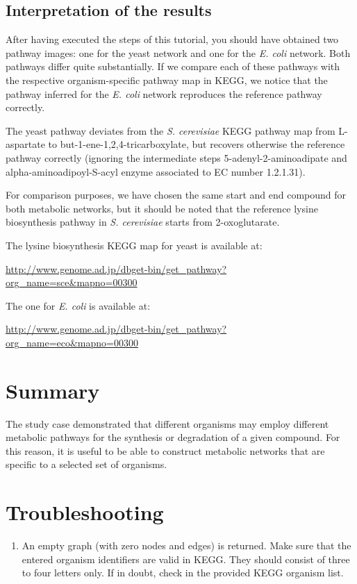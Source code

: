 \subsection{Interpretation of the results}

After having executed the steps of this tutorial, you should have
obtained two pathway images: one for the yeast network and one for the
\textit{E. coli} network. Both pathways differ quite substantially.
If we compare each of these pathways with the respective
organism-specific pathway map in KEGG, we notice that the pathway
inferred for the \textit{E. coli} network reproduces the reference
pathway correctly.

The yeast pathway deviates from the \textit{S. cerevisiae} KEGG
pathway map from L-aspartate to but-1-ene-1,2,4-tricarboxylate, but
recovers otherwise the reference pathway correctly (ignoring the
intermediate steps 5-adenyl-2-aminoadipate and
alpha-aminoadipoyl-S-acyl enzyme associated to EC number 1.2.1.31).

For comparison purposes, we have chosen the same start and end
compound for both metabolic networks, but it should be noted that the
reference lysine biosynthesis pathway in \textit{S. cerevisiae} starts
from 2-oxoglutarate.

The lysine biosynthesis KEGG map for yeast is available at:

\begin{footnotesize}\url{http://www.genome.ad.jp/dbget-bin/get_pathway?org_name=sce&mapno=00300}\end{footnotesize}

The one for \textit{E. coli} is available at:

\begin{footnotesize}\url{http://www.genome.ad.jp/dbget-bin/get_pathway?org_name=eco&mapno=00300}\end{footnotesize}


\section{Summary}

The study case demonstrated that different organisms may employ
different metabolic pathways for the synthesis or degradation of a
given compound. For this reason, it is useful to be able to construct
metabolic networks that are specific to a selected set of organisms.

\section{Troubleshooting}

\begin{enumerate}

\item An empty graph (with zero nodes and edges) is returned.  Make
  sure that the entered organism identifiers are valid in KEGG.  They
  should consist of three to four letters only. If in doubt, check in
  the provided KEGG organism list.

\end{enumerate}
